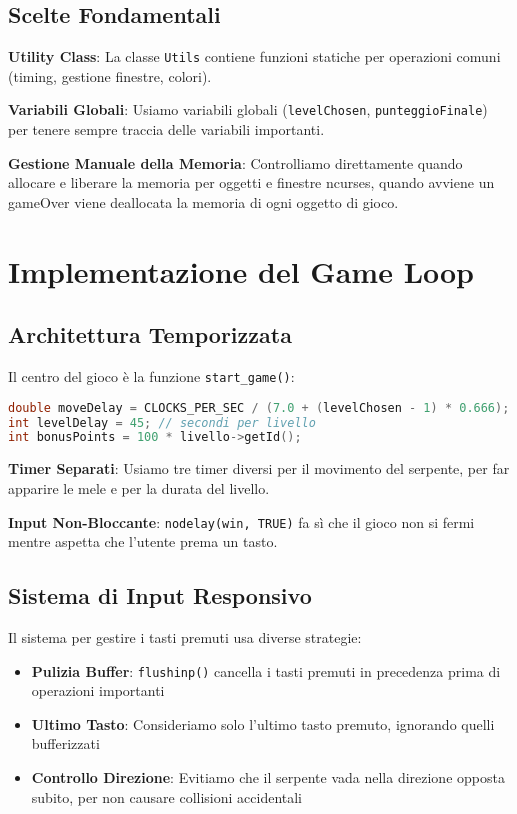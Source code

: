 \documentclass[a4paper,12pt]{article}
\begin{document}
\subsection{Scelte Fondamentali}

\textbf{Utility Class}: La classe \texttt{Utils} contiene funzioni statiche per operazioni comuni (timing, gestione finestre, colori).

\textbf{Variabili Globali}: Usiamo variabili globali (\texttt{levelChosen}, \texttt{punteggioFinale}) per tenere sempre traccia delle variabili importanti.

\textbf{Gestione Manuale della Memoria}: Controlliamo direttamente quando allocare e liberare la memoria per oggetti e finestre ncurses, quando avviene un gameOver viene deallocata la memoria di ogni oggetto di gioco.

\section{Implementazione del Game Loop}

\subsection{Architettura Temporizzata}

Il centro del gioco è la funzione \texttt{start\_game()}:

\begin{lstlisting}[language=C++]
double moveDelay = CLOCKS_PER_SEC / (7.0 + (levelChosen - 1) * 0.666);
int levelDelay = 45; // secondi per livello
int bonusPoints = 100 * livello->getId();
\end{lstlisting}

\textbf{Timer Separati}: Usiamo tre timer diversi per il movimento del serpente, per far apparire le mele e per la durata del livello.

\textbf{Input Non-Bloccante}: \texttt{nodelay(win, TRUE)} fa sì che il gioco non si fermi mentre aspetta che l'utente prema un tasto.

\subsection{Sistema di Input Responsivo}

Il sistema per gestire i tasti premuti usa diverse strategie:

\begin{itemize}
    \item \textbf{Pulizia Buffer}: \texttt{flushinp()} cancella i tasti premuti in precedenza prima di operazioni importanti
    \item \textbf{Ultimo Tasto}: Consideriamo solo l'ultimo tasto premuto, ignorando quelli bufferizzati
    \item \textbf{Controllo Direzione}: Evitiamo che il serpente vada nella direzione opposta subito, per non causare collisioni accidentali
\end{itemize}
\end{document}
